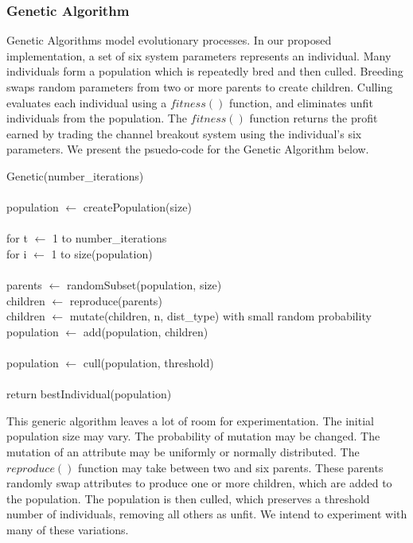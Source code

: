 \documentclass[12pt]{article}
\begin{document}
\subsubsection{Genetic Algorithm}

Genetic Algorithms model evolutionary processes.  In our proposed
implementation, a set of six system parameters represents an individual.  Many
individuals form a population which is repeatedly bred and then culled.
Breeding swaps random parameters from two or more parents to create children.
Culling evaluates each individual using a $fitness()$ function, and eliminates
unfit individuals from the population.  The $fitness()$ function returns the
profit earned by trading the channel breakout system using the individual's six
parameters.  We present the psuedo-code for the Genetic Algorithm below.

\vspace{10pt}
\setlength{\parindent}{5mm}
\indent Genetic(number\_iterations)\\\\
\indent\indent population $\leftarrow$ createPopulation(size)\\\\
\indent \indent for t $\leftarrow$ 1 to number\_iterations\\
\indent \indent \indent for i $\leftarrow$ 1 to size(population)\\\\
\indent \indent \indent \indent parents $\leftarrow$ randomSubset(population, size)\\
\indent \indent \indent \indent children $\leftarrow$ reproduce(parents)\\
\indent \indent \indent \indent children $\leftarrow$ mutate(children, n, dist\_type) with small random probability\\
\indent \indent \indent \indent population $\leftarrow$ add(population, children)\\\\
\indent \indent \indent population $\leftarrow$ cull(population, threshold)\\\\
\indent \indent return bestIndividual(population)\\
\setlength{\parindent}{0mm}

This generic algorithm leaves a lot of room for experimentation. The initial
population size may vary.  The probability of mutation may be changed.  The
mutation of an attribute may be uniformly or normally distributed.  The
$reproduce()$ function may take between two and six parents.  These parents
randomly swap attributes to produce one or more children, which are added to
the population.  The population is then culled, which preserves a threshold
number of individuals, removing all others as unfit. We intend to experiment
with many of these variations.
\end{document}
